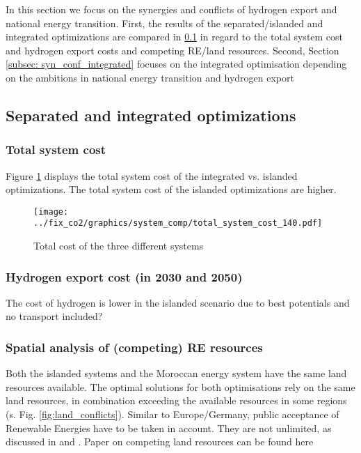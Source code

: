 In this section we focus on the synergies and conflicts
of hydrogen export and national energy transition.
First, the results of the separated/islanded and integrated optimizations
are compared in \ref{subsec: sep_int_opti} in regard to the total system cost and
hydrogen export costs and competing RE/land resources.
Second, Section \ref{subsec: syn_conf_integrated} focuses on the integrated optimisation 
depending on the ambitions in national energy transition and hydrogen export

\subsection{Separated and integrated optimizations}
\label{subsec: sep_int_opti}

\subsubsection{Total system cost}
Figure \ref{fig:int_sep_total_system_cost} displays the total system cost
of the integrated vs. islanded optimizations. The total system cost of the
islanded optimizations are higher.

\begin{figure}[h!]
    \centering
    \texttt{[image: ../fix\_co2/graphics/system\_comp/total\_system\_cost\_140.pdf]}
    \caption{Total cost of the three different systems}
    \label{fig:int_sep_total_system_cost}
\end{figure}

\subsubsection{Hydrogen export cost (in 2030 and 2050)}
The cost of hydrogen is lower in the islanded scenario due to best potentials and no transport included?

\subsubsection{Spatial analysis of (competing) RE resources}
Both the islanded systems and the Moroccan energy system have the same land resources available. 
The optimal solutions for both optimisations rely on the same land resources, in combination exceeding the 
available resources in some regions (s. Fig. \ref{fig:land_conflicts}). 
Similar to Europe/Germany, public acceptance of Renewable Energies have to be taken in account. 
They are not unlimited, as discussed in \cite{Hanger2016} and \cite{TerraponPfaff2019}.
Paper on competing land resources can be found here \cite{Patankar2022}


